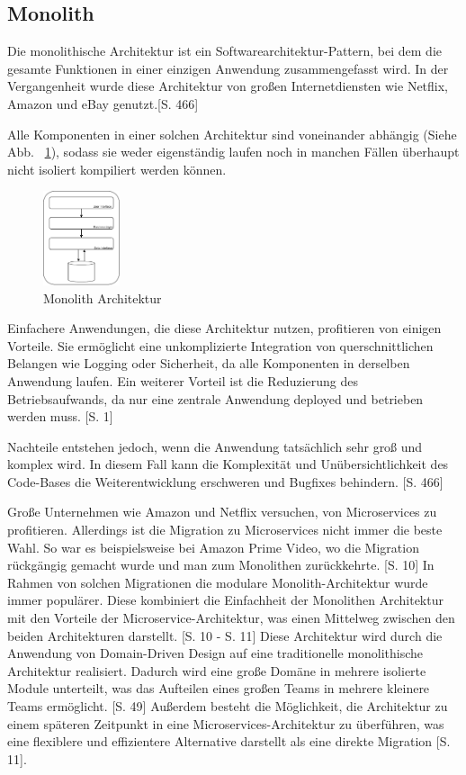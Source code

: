 \documentclass[acmtog]{acmart}
\begin{document}
\subsection{Monolith}
Die monolithische Architektur ist ein Softwarearchitektur-Pattern, bei dem die gesamte Funktionen in 
einer einzigen Anwendung zusammengefasst wird. 
In der Vergangenheit wurde diese Architektur von großen Internetdiensten wie Netflix, 
Amazon und eBay genutzt.\cite{mono}[S. 466]

Alle Komponenten in einer solchen Architektur sind voneinander abhängig (Siehe Abb. ~\ref{fig:mono}), sodass sie 
weder eigenständig laufen noch in manchen Fällen überhaupt nicht isoliert kompiliert werden können. \cite{mono3}

\begin{figure}[h!]
    \centering
    \includegraphics[width=0.2\textwidth]{images/mono.pdf}
    \caption{Monolith Architektur}
    \label{fig:mono}
\end{figure}

Einfachere Anwendungen, die diese Architektur nutzen, profitieren von einigen Vorteile. 
Sie ermöglicht eine unkomplizierte Integration von querschnittlichen Belangen 
wie Logging oder Sicherheit, da alle Komponenten in derselben Anwendung laufen. 
Ein weiterer Vorteil ist die Reduzierung des Betriebsaufwands, da nur eine 
zentrale Anwendung deployed und betrieben werden muss. \cite{mono2}[S. 1]

Nachteile entstehen jedoch, wenn die Anwendung tatsächlich sehr groß und komplex 
wird. In diesem Fall kann die Komplexität und Unübersichtlichkeit des Code-Bases 
die Weiterentwicklung erschweren und Bugfixes behindern. \cite{mono}[S. 466]

Große Unternehmen wie Amazon und Netflix versuchen, von Microservices 
zu profitieren. Allerdings ist die Migration zu Microservices nicht immer 
die beste Wahl. So war es beispielsweise bei Amazon Prime Video, wo die Migration
rückgängig gemacht wurde und man zum Monolithen zurückkehrte. \cite{modular-mono2}[S. 10]
In Rahmen von solchen Migrationen die modulare Monolith-Architektur wurde immer populärer.
Diese kombiniert die Einfachheit der Monolithen Architektur mit den 
Vorteile der Microservice-Architektur, was einen Mittelweg zwischen 
den beiden Architekturen darstellt. \cite{modular-mono2}[S. 10 - S. 11]
Diese Architektur wird durch die Anwendung von Domain-Driven Design auf 
eine traditionelle monolithische Architektur realisiert.
Dadurch wird eine große Domäne in mehrere isolierte Module unterteilt, was das Aufteilen 
 eines großen Teams in mehrere kleinere Teams ermöglicht. \cite{modular-mono1}[S. 49]
 Außerdem besteht die Möglichkeit, die Architektur zu einem 
späteren Zeitpunkt in eine Microservices-Architektur zu 
überführen, was eine flexiblere und effizientere Alternative darstellt
als eine direkte Migration \cite{modular-mono1}[S. 11].
\end{document}
